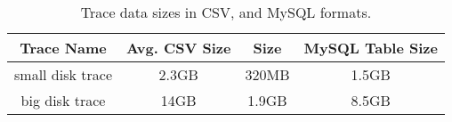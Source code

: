 






\begin{table*}[tbh]
\centering
\begin{tabular}{|c|c|c|c|}\hline
Trace Name & Avg. CSV Size & \DataSeries{} Size & MySQL Table Size\\
\hline
small disk trace & 2.3GB & 320MB & 1.5GB\\
big disk trace & 14GB & 1.9GB & 8.5GB \\
\hline
\end{tabular}
\caption{ Trace data sizes in CSV, \DataSeries{} and MySQL formats.}
\label{table:dataSizes}
\end{table*}


